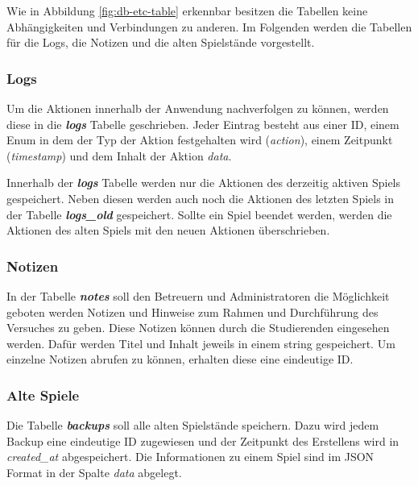 Wie in Abbildung \ref{fig:db-etc-table} erkennbar besitzen die Tabellen keine Abhängigkeiten und Verbindungen zu anderen. Im Folgenden werden die Tabellen für die Logs, die Notizen und die alten Spielstände vorgestellt.

\subsubsection{Logs}
Um die Aktionen innerhalb der Anwendung nachverfolgen zu können, werden diese in die \textbf{\textit{logs}} Tabelle geschrieben. Jeder Eintrag besteht aus einer ID, einem Enum in dem der Typ der Aktion festgehalten wird (\textit{action}), einem Zeitpunkt (\textit{timestamp}) und dem Inhalt der Aktion \textit{data}. 

Innerhalb der \textbf{\textit{logs}} Tabelle werden nur die Aktionen des derzeitig aktiven Spiels gespeichert. Neben diesen werden auch noch die Aktionen des letzten Spiels in der Tabelle \textbf{\textit{logs\_old}} gespeichert. Sollte ein Spiel beendet werden, werden die Aktionen des alten Spiels mit den neuen Aktionen überschrieben.

\subsubsection{Notizen}
In der Tabelle \textbf{\textit{notes}} soll den Betreuern und Administratoren die Möglichkeit geboten werden Notizen und Hinweise zum Rahmen und Durchführung des Versuches zu geben. Diese Notizen können durch die Studierenden eingesehen werden. Dafür werden Titel und Inhalt jeweils in einem string gespeichert. Um einzelne Notizen abrufen zu können, erhalten diese eine eindeutige ID.

\subsubsection{Alte Spiele}
Die Tabelle \textbf{\textit{backups}} soll alle alten Spielstände speichern. Dazu wird jedem Backup eine eindeutige ID zugewiesen und der Zeitpunkt des Erstellens wird in \textit{created\_at} abgespeichert. Die Informationen zu einem Spiel sind im JSON Format in der Spalte \textit{data} abgelegt.